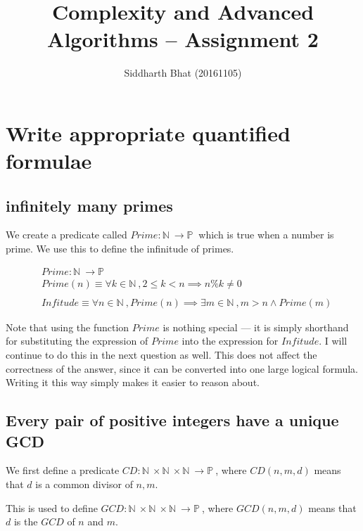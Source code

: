 \documentclass{article}
\author{Siddharth Bhat (20161105)}
\title{Complexity and Advanced Algorithms -- Assignment 2}
\begin{document}
\newcommand{\threesat}{\texttt{3-SAT}~}
\newcommand{\pspace}{\texttt{PSPACE}~}
\newcommand{\np}{\texttt{NP}~}
\newcommand{\nat}{\mathbb{N}~}
\newcommand{\pred}{\mathbb{P}~}
\newcommand{\logspace}{\texttt{LOGSPACE}~}
\newcommand{\ptime}{\texttt{P}~}
\newcommand{\nptime}{\texttt{NP}~}
\maketitle

\section{Write appropriate quantified formulae}
\subsection{infinitely many primes}
We create a predicate called $Prime : \nat \to \pred$ which is true
when a number is prime. We use this to define the infinitude of primes.

\begin{align*}
    &Prime: \nat \to \pred \\
    &Prime(n) \equiv \forall k \in \nat, 2 \leq k < n \implies n \% k \neq 0
    \\
    \\
    &Infitude \equiv \forall n \in \nat, Prime(n) \implies \exists m \in \nat, m > n \land Prime(m)
\end{align*}

Note that using the function $Prime$ is nothing special --- it is simply
shorthand for substituting the expression of $Prime$ into the expression
for $Infitude$. I will continue to do this in the next question as well.
This does not affect the correctness of the answer, since it can be converted
into one large logical formula. Writing it this way simply makes it
easier to reason about.

\subsection{Every pair of positive integers have a unique GCD}

We first define a predicate $CD: \nat \times \nat \times \nat \to \pred$, where
$CD(n, m, d)$ means that $d$ is a common divisor of $n, m$.

This is used to define $GCD: \nat \times \nat \times \nat \to \pred$, where
$GCD(n, m, d)$ means that $d$ is the $GCD$ of $n$ and $m$. 
\end{document}
